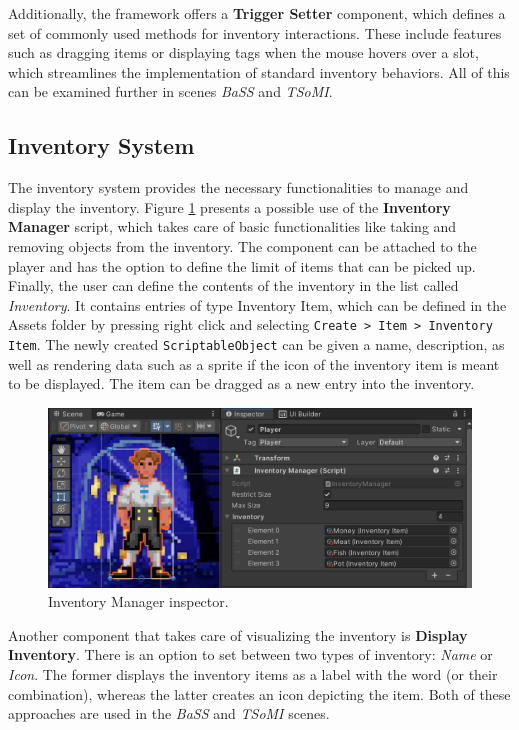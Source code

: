 Additionally, the framework offers a \textbf{Trigger Setter} component, which defines a set of commonly used methods for inventory interactions. These include features such as dragging items or displaying tags when the mouse hovers over a slot, which streamlines the implementation of standard inventory behaviors. All of this can be examined further in scenes \textit{BaSS} and \textit{TSoMI}.

\subsection{Inventory System}
\label{UD-IS}
The inventory system provides the necessary functionalities to manage and display the inventory. Figure \ref{fig:Manual-Inventory} presents a possible use of the \textbf{Inventory Manager} script, which takes care of basic functionalities like taking and removing objects from the inventory. The component can be attached to the player and has the option to define the limit of items that can be picked up. Finally, the user can define the contents of the inventory in the list called \textit{Inventory}. It contains entries of type Inventory Item, which can be defined in the Assets folder by pressing right click and selecting \verb|Create > Item > Inventory Item|. The newly created \verb|ScriptableObject| can be given a name, description, as well as rendering data such as a sprite if the icon of the inventory item is meant to be displayed. The item can be dragged as a new entry into the inventory.
\begin{figure}[H]
\centering
\includegraphics[width=.8\linewidth]{img/User doc/inventory.png}
\caption{Inventory Manager inspector.}
\label{fig:Manual-Inventory}
\end{figure}

Another component that takes care of visualizing the inventory is \textbf{Display Inventory}. There is an option to set between two types of inventory: \textit{Name} or \textit{Icon}. The former displays the inventory items as a label with the word (or their combination), whereas the latter creates an icon depicting the item. Both of these approaches are used in the \textit{BaSS} and \textit{TSoMI} scenes.

